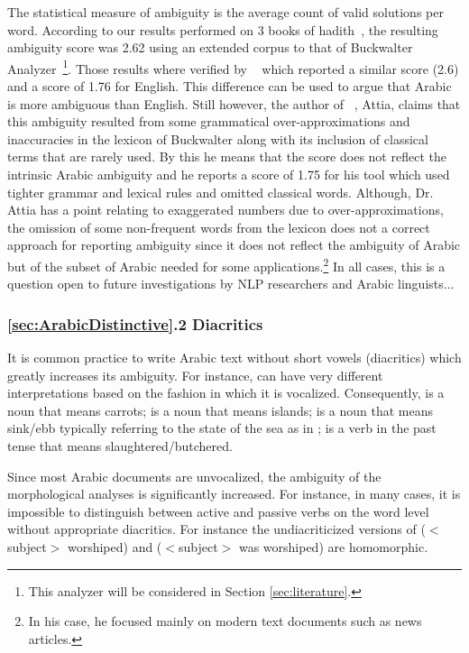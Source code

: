 \documentclass[a4,12pt]{report}
\newcommand{\noVocRL}[1]{\transtrue\novocalize\RL{#1}\vocalize}
\begin{document}
	The statistical measure of ambiguity is the average count of valid solutions per word. According to our results performed
	on 3 books of hadith~\cite{IbnHanbal,AlKulayni,AlTousi}, the resulting ambiguity score was 2.62 using an extended corpus to that of
	Buckwalter Analyzer~\cite{Buckwalter:02}\footnote{This analyzer will be considered in Section \ref{sec:literature}.}.
	Those results where verified by ~\cite{Attia:06b} which reported a similar score (2.6) and a score of 1.76 for English.
	This difference can be used to argue that Arabic is more ambiguous than English. Still however, the author of ~\cite{Attia:06b}, Attia,
	claims that this ambiguity resulted from some grammatical over-approximations and inaccuracies in the lexicon of Buckwalter along with
	its inclusion of classical terms that are rarely used. By this he means that the score does not reflect the intrinsic Arabic ambiguity and 
	he reports a score of 1.75 for his tool which used tighter grammar and lexical rules and omitted classical words. Although, Dr. Attia
	has a point relating to exaggerated numbers due to over-approximations, the omission of some non-frequent words from the lexicon 
	does not a correct approach for reporting ambiguity since it does
	not reflect the ambiguity of Arabic but of the subset of Arabic needed for some applications.\footnote{
	In his case, he focused mainly on modern text documents such as news articles.}
	In all cases, this is a question open to future investigations by NLP researchers and Arabic linguists...

\subsubsection{\ref*{sec:ArabicDistinctive}.2 Diacritics}

	It is common practice to write Arabic text without short vowels (diacritics) 
	which greatly increases its ambiguity. For instance, \noVocRL{jzr} can have very different interpretations based on 
	the fashion in which it is vocalized. Consequently, 
	 is a noun that means carrots; 
	 is a noun that means islands; 
	 is a noun that means sink/ebb typically referring to the state of the sea as in \noVocRL{Al-mad wAl-jazr};
	 is a verb in the past tense that means slaughtered/butchered.
	
	Since most Arabic documents are unvocalized, the ambiguity of the morphological analyses is significantly increased.
	For instance, in many cases, it is impossible to distinguish between active and passive verbs on the word level without
	appropriate diacritics. For instance the undiacriticized versions of  ($<$subject$>$ worshiped) and  ($<$subject$>$ was worshiped) are homomorphic.
	
\end{document}
